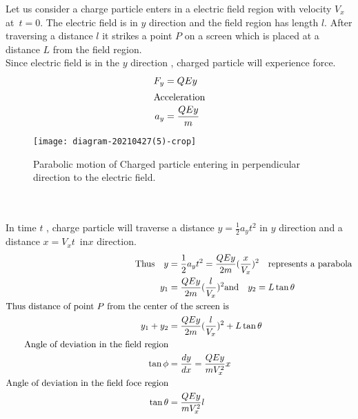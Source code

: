  \begin{minipage}{0.55\textwidth}
Let us consider a charge particle enters in a electric field region with velocity $V_x$ at\ $t=0$. The electric field is in $y$ direction and the field region has length $l$. After traversing a distance $l$ it strikes a point $P$ on a screen which is placed at a distance $L$ from the field region. \\
Since electric field is in the $y$ direction , charged particle will experience force.
\begin{align*}
F_y&=QEy\\ 
\intertext{Acceleration}
a_y&=\frac{QEy}{m}\\
\end{align*}
\end{minipage}
\begin{minipage}{0.45\textwidth}
	\begin{figure}[H]
		\centering
		\texttt{[image: diagram-20210427(5)-crop]}
		\caption{Parabolic motion of Charged particle entering in   perpendicular direction to the electric field.}
		\label{rc current discharge}
	\end{figure}
\end{minipage}\\\\	
In time $t$ , charge particle will traverse a distance $y=\frac{1}{2}a_yt^2$ in $y$ direction and a distance $x=V_xt$\  in$x$ direction.
\begin{align*}
\text{Thus}\quad y&=\frac{1}{2}a_yt^2=\frac{QEy}{2m}(\frac{x}{V_x})^2 \quad\text{represents a parabola}\\
y_1&=\frac{QEy}{2m}(\frac{l}{V_x})^2\text{and}\quad y_2=L \tan\theta\\
\intertext{Thus distance of point $P$ from the center of the screen is}
y_1+y_2&=\frac{QEy}{2m}(\frac{l}{V_x})^2+L \tan\theta\\
\text{Angle of deviation in the field region}\\
\tan\phi&=\frac{dy}{dx}=\frac{QEy}{mV_x^2}x\\
\text{Angle of deviation in the field foce region}\\
\tan\theta&=\frac{QEy}{mV_x^2}l
\end{align*}

